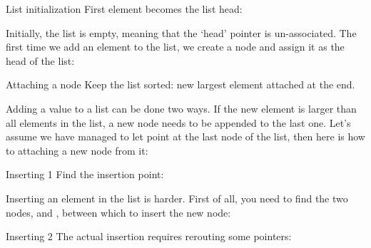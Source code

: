 \begin{block}{List initialization}
  First element becomes the list head:

  
\end{block}

Initially, the list is empty, meaning that the `head' pointer is
un-associated. The first time we add an element to the list, we create
a node and assign it as the head of the list:
%

\begin{block}{Attaching a node}
  Keep the list sorted: new largest element attached at the end.
  
\end{block}

Adding a value to a list can be done two ways. If the new element is
larger than all elements in the list, a new node needs to be appended
to the last one. Let's assume we have managed
to let  point at the last node of the list,
then here is how to 
attaching a new node from it:
%

\begin{block}{Inserting 1}
  Find the insertion point:
\end{block}

Inserting an element in the list is harder.
First of all, you need to find the two nodes,
 and , between which to insert the new node:
%

\begin{block}{Inserting 2}
  The actual insertion requires rerouting some pointers:
\end{block}
